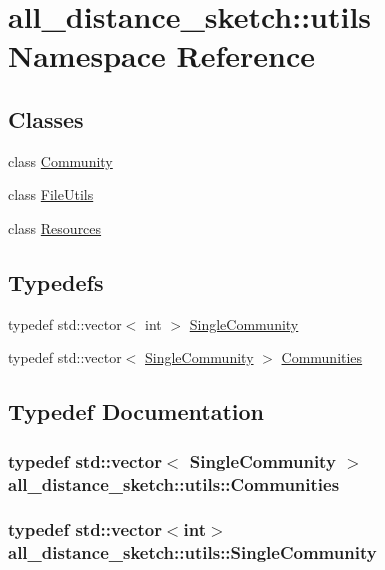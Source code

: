 \hypertarget{namespaceall__distance__sketch_1_1utils}{}\section{all\+\_\+distance\+\_\+sketch\+:\+:utils Namespace Reference}
\label{namespaceall__distance__sketch_1_1utils}
\subsection*{Classes}
\begin{DoxyCompactItemize}
\item 
class \hyperlink{classall__distance__sketch_1_1utils_1_1Community}{Community}
\item 
class \hyperlink{classall__distance__sketch_1_1utils_1_1FileUtils}{File\+Utils}
\item 
class \hyperlink{classall__distance__sketch_1_1utils_1_1Resources}{Resources}
\end{DoxyCompactItemize}
\subsection*{Typedefs}
\begin{DoxyCompactItemize}
\item 
typedef std\+::vector$<$ int $>$ \hyperlink{namespaceall__distance__sketch_1_1utils_a3e66a256d84fffdb83e5e846d2953ab6}{Single\+Community}
\item 
typedef std\+::vector$<$ \hyperlink{namespaceall__distance__sketch_1_1utils_a3e66a256d84fffdb83e5e846d2953ab6}{Single\+Community} $>$ \hyperlink{namespaceall__distance__sketch_1_1utils_a0461e060ec3e914e1904aa353f403b60}{Communities}
\end{DoxyCompactItemize}


\subsection{Typedef Documentation}
\hypertarget{namespaceall__distance__sketch_1_1utils_a0461e060ec3e914e1904aa353f403b60}{}
\subsubsection[{Communities}]{\setlength{\rightskip}{0pt plus 5cm}typedef std\+::vector$<$ {\bf Single\+Community} $>$ {\bf all\+\_\+distance\+\_\+sketch\+::utils\+::\+Communities}}\label{namespaceall__distance__sketch_1_1utils_a0461e060ec3e914e1904aa353f403b60}
\hypertarget{namespaceall__distance__sketch_1_1utils_a3e66a256d84fffdb83e5e846d2953ab6}{}
\subsubsection[{Single\+Community}]{\setlength{\rightskip}{0pt plus 5cm}typedef std\+::vector$<$int$>$ {\bf all\+\_\+distance\+\_\+sketch\+::utils\+::\+Single\+Community}}\label{namespaceall__distance__sketch_1_1utils_a3e66a256d84fffdb83e5e846d2953ab6}
